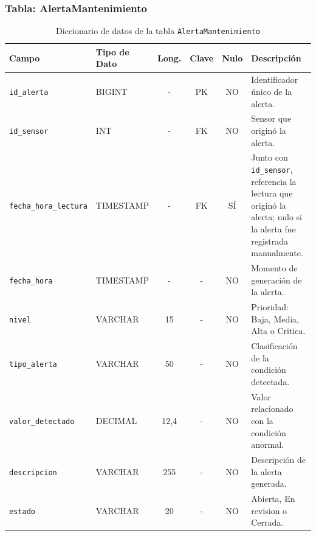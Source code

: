 \documentclass[11pt,a4paper]{article}
\begin{document}
\subsubsection{Tabla: AlertaMantenimiento}
\begin{table}[H]
\centering
\small
\caption{Diccionario de datos de la tabla \texttt{AlertaMantenimiento}}
\begin{tabular}{|l|l|c|c|c|p{5.1cm}|}
\hline
\textbf{Campo} & \textbf{Tipo de Dato} & \textbf{Long.} & \textbf{Clave} & \textbf{Nulo} & \textbf{Descripción} \\ \hline
\texttt{id\_alerta} & BIGINT & - & PK & NO & Identificador único de la alerta. \\ \hline
\texttt{id\_sensor} & INT & - & FK & NO & Sensor que originó la alerta. \\ \hline
\texttt{fecha\_hora\_lectura} & TIMESTAMP & - & FK & SÍ & Junto con \texttt{id\_sensor}, referencia la lectura que originó la alerta; nulo si la alerta fue registrada manualmente. \\ \hline
\texttt{fecha\_hora} & TIMESTAMP & - & - & NO & Momento de generación de la alerta. \\ \hline
\texttt{nivel} & VARCHAR & 15 & - & NO & Prioridad: Baja, Media, Alta o Critica. \\ \hline
\texttt{tipo\_alerta} & VARCHAR & 50 & - & NO & Clasificación de la condición detectada. \\ \hline
\texttt{valor\_detectado} & DECIMAL & 12,4 & - & NO & Valor relacionado con la condición anormal. \\ \hline
\texttt{descripcion} & VARCHAR & 255 & - & NO & Descripción de la alerta generada. \\ \hline
\texttt{estado} & VARCHAR & 20 & - & NO & Abierta, En revision o Cerrada. \\ \hline
\end{tabular}
\end{table}

\end{document}
